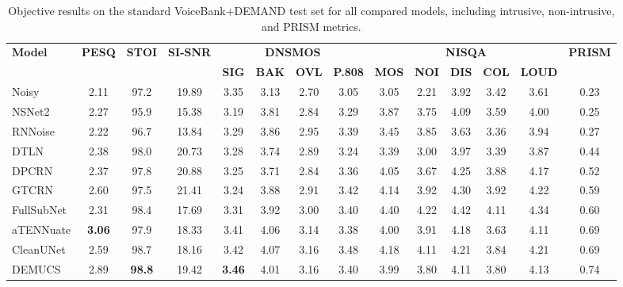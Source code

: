 \documentclass[final,5p,times,authoryear]{elsarticle}
\begin{document}
\begin{table}
    \centering
    \caption{Objective results on the standard VoiceBank+DEMAND test set for all compared models, including intrusive, non-intrusive, and PRISM metrics.}
    \small
    \setlength{\tabcolsep}{4pt}
    \renewcommand{\arraystretch}{1.15}

    \begin{tabular}{lccccccccccccc}
    \toprule
    \multirow{2}{*}{\textbf{Model}} &
    \multirow{2}{*}{\textbf{PESQ}} &
    \multirow{2}{*}{\textbf{STOI}} &
    \multirow{2}{*}{\textbf{SI-SNR}} &
    \multicolumn{4}{c}{\textbf{DNSMOS}} &
    \multicolumn{5}{c}{\textbf{NISQA}} &
    \multirow{2}{*}{\textbf{PRISM}} \\
    \cmidrule(lr){5-8} \cmidrule(lr){9-13}
     &  &  &  & \textbf{SIG} & \textbf{BAK} & \textbf{OVL} & \textbf{P.808} &
     \textbf{MOS} & \textbf{NOI} & \textbf{DIS} & \textbf{COL} & \textbf{LOUD} & \\
    \midrule
    Noisy & 2.11 & 97.2 & 19.89 & 3.35 & 3.13 & 2.70 & 3.05 & 3.05 & 2.21 & 3.92 & 3.42 & 3.61 & \cellcolor{prismblue}0.23 \\
    \midrule
    NSNet2 & 2.27 & 95.9 & 15.38 & 3.19 & 3.81 & 2.84 & 3.29 & 3.87 & 3.75 & 4.09 & 3.59 & 4.00 & \cellcolor{prismblue}0.25 \\
    RNNoise & 2.22 & 96.7 & 13.84 & 3.29 & 3.86 & 2.95 & 3.39 & 3.45 & 3.85 & 3.63 & 3.36 & 3.94 & \cellcolor{prismblue}0.27 \\
    DTLN & 2.38 & 98.0 & 20.73 & 3.28 & 3.74 & 2.89 & 3.24 & 3.39 & 3.00 & 3.97 & 3.39 & 3.87 & \cellcolor{prismblue}0.44 \\
    DPCRN & 2.37 & 97.8 & 20.88 & 3.25 & 3.71 & 2.84 & 3.36 & 4.05 & 3.67 & 4.25 & 3.88 & 4.17 & \cellcolor{prismblue}0.52 \\
    GTCRN & 2.60 & 97.5 & 21.41 & 3.24 & 3.88 & 2.91 & 3.42 & 4.14 & 3.92 & 4.30 & 3.92 & 4.22 & \cellcolor{prismblue}0.59 \\
    FullSubNet & 2.31 & 98.4 & 17.69 & 3.31 & 3.92 & 3.00 & 3.40 & 4.40 & 4.22 & 4.42 & 4.11 & 4.34 & \cellcolor{prismblue}0.60 \\
    aTENNuate & \textbf{3.06} & 97.9 & 18.33 & 3.41 & 4.06 & 3.14 & 3.38 & 4.00 & 3.91 & 4.18 & 3.63 & 4.11 & \cellcolor{prismblue}0.69 \\
    CleanUNet & 2.59 & 98.7 & 18.16 & 3.42 & 4.07 & 3.16 & 3.48 & 4.18 & 4.11 & 4.21 & 3.84 & 4.21 & \cellcolor{prismblue}0.69 \\
    DEMUCS & 2.89 & \textbf{98.8} & 19.42 & \textbf{3.46} & 4.01 & 3.16 & 3.40 & 3.99 & 3.80 & 4.11 & 3.80 & 4.13 & \cellcolor{prismblue}0.74 \\

\end{tabular}
\end{table}
\end{document}
